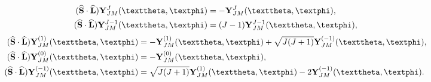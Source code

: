 \begin{enumerate}[label=(\alph*)]
\begin{align}
(\widehat{\vect{S}} \cdot \widehat{\vect{L}}) \vect{Y}_{J M}^{J}(\vartheta, \varphi) & =-\vect{Y}_{J M}^{J}(\vartheta, \varphi), \label{eq:7:3:68}\\
(\widehat{\vect{S}} \cdot \widehat{\vect{L}}) \vect{Y}_{J M}^{J-1}(\vartheta, \varphi) & =(J-1) \vect{Y}_{J M}^{J-1}(\vartheta, \varphi), \notag
\end{align}
\begin{align}
(\widehat{\vect{S}} \cdot \widehat{\vect{L}}) \vect{Y}_{J M}^{(1)}(\vartheta, \varphi) & =-\vect{Y}_{J M}^{(1)}(\vartheta, \varphi)+\sqrt{J(J+1)} \vect{Y}_{J M}^{(-1)}(\vartheta, \varphi), \notag\\
(\widehat{\vect{S}} \cdot \widehat{\vect{L}}) \vect{Y}_{J M}^{(0)}(\vartheta, \varphi) & =-\vect{Y}_{J M}^{(0)}(\vartheta, \varphi), \label{eq:7:3:69}\\
(\widehat{\vect{S}} \cdot \widehat{\vect{L}}) \vect{Y}_{J M}^{(-1)}(\vartheta, \varphi) & =\sqrt{J(J+1)} \vect{Y}_{J M}^{(1)}(\vartheta, \varphi)-2 \vect{Y}_{J M}^{(-1)}(\vartheta, \varphi). \notag
\end{align}
\end{enumerate}

